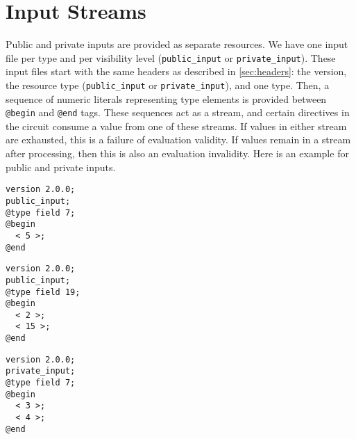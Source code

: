 
\section{Input Streams}\label{sec:streams}
Public and private inputs are provided as separate resources. 
We have one input file per type and per visibility level (\texttt{public\_input} or \texttt{private\_input}).
These input files start with the same headers as described in \cref{sec:headers}: the version, the resource type (\texttt{public\_input} or \texttt{private\_input}), and one type.
Then, a sequence of numeric literals representing type elements is provided between \texttt{@begin} and \texttt{@end} tags.
These sequences act as a stream, and certain directives in the circuit %
consume a value from one of these streams.
If values in either stream are exhausted, this is a failure of evaluation validity.
If values remain in a stream after processing, then this is also an evaluation invalidity.
Here is an example for public and private inputs. 

\begin{lstlisting}[language=ir]
version 2.0.0;
public_input;
@type field 7;
@begin
  < 5 >;
@end
\end{lstlisting}
%
\begin{lstlisting}[language=ir]
version 2.0.0;
public_input;
@type field 19;
@begin
  < 2 >;
  < 15 >;
@end
\end{lstlisting}
%
\begin{lstlisting}[language=ir]
version 2.0.0;
private_input;
@type field 7;
@begin
  < 3 >;
  < 4 >;
@end
\end{lstlisting}
